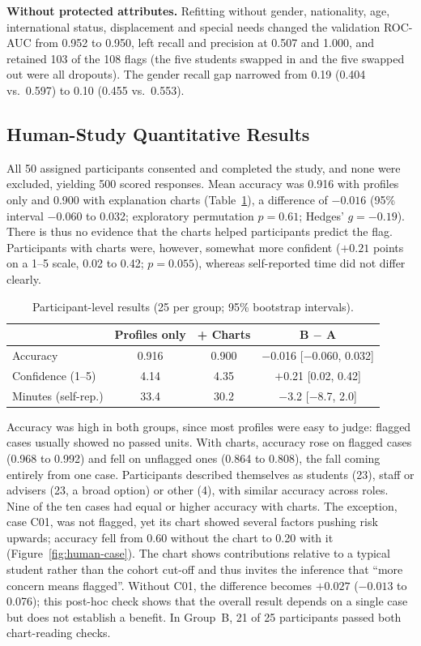 \textbf{Without protected attributes.} Refitting \tabicl without gender, nationality, age,
international status, displacement and special needs changed the validation ROC-AUC from 0.952 to
0.950, left recall and precision at 0.507 and 1.000, and retained 103 of the 108 flags (the five
students swapped in and the five swapped out were all dropouts). The gender recall gap narrowed from
0.19 (0.404 vs.\ 0.597) to 0.10 (0.455 vs.\ 0.553).

\subsection{Human-Study Quantitative Results}
\label{sec:human}

All 50 assigned participants consented and completed the study, and none were excluded, yielding
500 scored responses. Mean accuracy was 0.916 with profiles only and 0.900 with explanation charts
(Table~\ref{tab:human}), a difference of $-0.016$ (95\% interval $-0.060$ to 0.032; exploratory
permutation $p=0.61$; Hedges' $g=-0.19$). There is thus no evidence that the charts helped
participants predict the flag. Participants with charts were, however, somewhat more confident
($+0.21$ points on a 1--5 scale, 0.02 to 0.42; $p=0.055$), whereas self-reported time did not differ
clearly.

\begin{table}[!htb]
\centering
\caption{Participant-level results (25 per group; 95\% bootstrap intervals).}
\label{tab:human}
\footnotesize
\setlength{\tabcolsep}{3pt}
\begin{tabular}{@{}lccc@{}}
\toprule
 & \textbf{Profiles only} & \textbf{+ Charts} & \textbf{B $-$ A} \\
\midrule
Accuracy   & 0.916 & 0.900 & $-$0.016 [$-$0.060, 0.032] \\
Confidence (1--5) & 4.14 & 4.35 & $+$0.21 [0.02, 0.42] \\
Minutes (self-rep.) & 33.4 & 30.2 & $-$3.2 [$-$8.7, 2.0] \\
\bottomrule
\end{tabular}
\end{table}

Accuracy was high in both groups, since most profiles were easy to judge: flagged cases usually
showed no passed units. With charts, accuracy rose on flagged cases (0.968 to 0.992) and fell on
unflagged ones (0.864 to 0.808), the fall coming entirely from one case. Participants described themselves as students (23), staff or advisers (23,
a broad option) or other (4), with similar accuracy across roles. Nine of the ten cases had equal or higher accuracy with charts. The
exception, case C01, was not flagged, yet its chart showed several factors pushing risk upwards;
accuracy fell from 0.60 without the chart to 0.20 with it (Figure~\ref{fig:human-case}). The chart
shows contributions relative to a typical student rather than the cohort cut-off and thus invites
the inference that ``more concern means flagged''. Without C01, the difference becomes $+0.027$
($-0.013$ to 0.076); this post-hoc check shows that the overall result depends on a single case but
does not establish a benefit. In Group~B, 21 of 25 participants passed both chart-reading checks.

